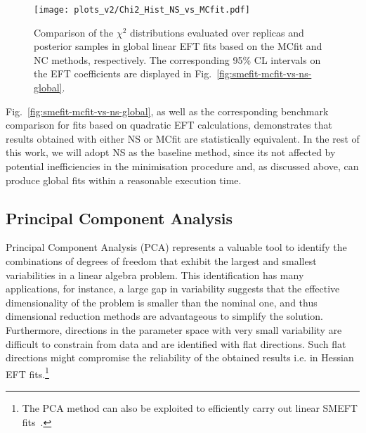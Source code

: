 \begin{figure}[t]
  \begin{center}
    \texttt{[image: plots\_v2/Chi2\_Hist\_NS\_vs\_MCfit.pdf]}
    \vspace{-0.3cm}
    \caption{\small Comparison of the $\chi^2$ distributions evaluated over replicas
      and posterior samples in global linear EFT fits based on the MCfit
      and NC methods, respectively.
      The corresponding 95\% CL intervals on the EFT coefficients are
      displayed in Fig.~\ref{fig:smefit-mcfit-vs-ns-global}.
     \label{fig:chi2dist_mcfit_vs_ns} }
  \end{center}
\end{figure}

Fig.~\ref{fig:smefit-mcfit-vs-ns-global}, as well as the corresponding
benchmark comparison for fits based on quadratic EFT calculations, demonstrates
that results obtained with either NS or MCfit are statistically equivalent.
%
In the rest of this work, we will adopt NS as the baseline method,
since its not affected by potential inefficiencies in the minimisation procedure
and, as discussed above, can produce global fits within
a reasonable  execution time.


\subsection{Principal Component Analysis}
\label{sec:pca}

Principal Component Analysis (PCA) represents a valuable tool to identify the combinations of
degrees of freedom that exhibit the largest and smallest variabilities in a linear algebra problem.
%
This identification has many applications,
for instance, a large gap in variability suggests that the effective dimensionality
of the problem is smaller than the nominal one, and thus dimensional reduction methods
are advantageous to simplify the solution.
%
Furthermore, directions in the parameter space with very small variability are difficult
to constrain from data and are identified with flat directions.
%
Such flat directions might compromise the reliability of the
obtained results i.e. in Hessian EFT fits.\footnote{The PCA method can also be exploited to
  efficiently carry out linear SMEFT fits~\cite{Bodwin:2019ivc}.}

